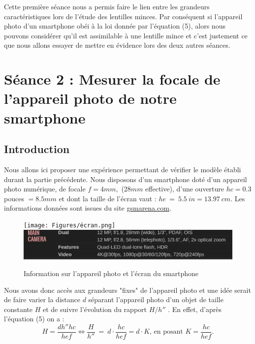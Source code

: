 \documentclass[12pt,a4paper]{article}
\begin{document}
Cette première séance nous a permis faire le lien entre les grandeurs caractéristiques lors de l'étude des lentilles minces.
Par conséquent si l'appareil photo d'un smartphone obéi à la loi donnée par l'équation (5), alors nous pouvons considérer qu'il est assimilable à une lentille mince et c'est justement ce que nous allons essayer de mettre en évidence lors des deux autres séances.
\section{Séance 2 : Mesurer la focale de l'appareil photo de notre smartphone}
\subsection{Introduction}
Nous allons ici proposer une expérience permettant de vérifier le modèle établi durant la partie précédente. Nous disposons d'un smartphone doté d'un appareil photo numérique, de focale $f = 4mm,$ (28$mm$ effective), d'une ouverture  $hc=0.3$ pouces $= 8.5 mm$ et dont la taille de l'écran vaut : $he~=~5.5~in = 13.97~cm$. Les informations données sont issues du site \underline{gsmarena.com}.
\begin{figure}[H]
\begin{center}
\texttt{[image: Figures/écran.png]}
\\
\includegraphics[scale=0.3]{Figures/photo.png}
\caption{Information sur l'appareil photo et l'écran du smartphone}
\end{center}
\end{figure}
Nous avons donc accès aux grandeurs "fixes" de l'appareil photo et une idée serait de faire varier la distance $d$ séparant l'appareil photo d'un objet de taille constante $H$ et de suivre l'évolution du rapport $H/h''$ . En effet, d'après l'équation (5) on a  : \\
\begin{equation}
H = \frac{dh''hc}{hef} \Longleftrightarrow \frac{H}{h''}~=~d\cdot \frac{hc}{hef} = d\cdot K \text{, en posant $K = \frac{hc}{hef}$}.
\end{equation}
\end{document}
